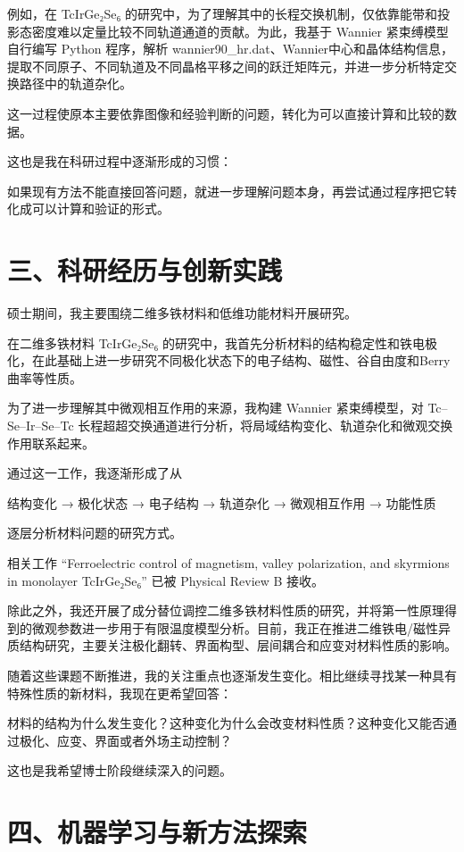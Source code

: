 例如，在 TcIrGe₂Se₆ 的研究中，为了理解其中的长程交换机制，仅依靠能带和投影态密度难以定量比较不同轨道通道的贡献。为此，我基于 Wannier 紧束缚模型自行编写 Python 程序，解析 wannier90\_hr.dat、Wannier中心和晶体结构信息，提取不同原子、不同轨道及不同晶格平移之间的跃迁矩阵元，并进一步分析特定交换路径中的轨道杂化。

这一过程使原本主要依靠图像和经验判断的问题，转化为可以直接计算和比较的数据。

这也是我在科研过程中逐渐形成的习惯：

如果现有方法不能直接回答问题，就进一步理解问题本身，再尝试通过程序把它转化成可以计算和验证的形式。

\section{三、科研经历与创新实践}

硕士期间，我主要围绕二维多铁材料和低维功能材料开展研究。

在二维多铁材料 TcIrGe₂Se₆ 的研究中，我首先分析材料的结构稳定性和铁电极化，在此基础上进一步研究不同极化状态下的电子结构、磁性、谷自由度和Berry曲率等性质。

为了进一步理解其中微观相互作用的来源，我构建 Wannier 紧束缚模型，对 Tc–Se–Ir–Se–Tc 长程超超交换通道进行分析，将局域结构变化、轨道杂化和微观交换作用联系起来。

通过这一工作，我逐渐形成了从

结构变化 → 极化状态 → 电子结构 → 轨道杂化 → 微观相互作用 → 功能性质

逐层分析材料问题的研究方式。

相关工作 “Ferroelectric control of magnetism, valley polarization, and skyrmions in monolayer TcIrGe₂Se₆” 已被 Physical Review B 接收。

除此之外，我还开展了成分替位调控二维多铁材料性质的研究，并将第一性原理得到的微观参数进一步用于有限温度模型分析。目前，我正在推进二维铁电/磁性异质结构研究，主要关注极化翻转、界面构型、层间耦合和应变对材料性质的影响。

随着这些课题不断推进，我的关注重点也逐渐发生变化。相比继续寻找某一种具有特殊性质的新材料，我现在更希望回答：

材料的结构为什么发生变化？这种变化为什么会改变材料性质？这种变化又能否通过极化、应变、界面或者外场主动控制？

这也是我希望博士阶段继续深入的问题。

\section{四、机器学习与新方法探索}

